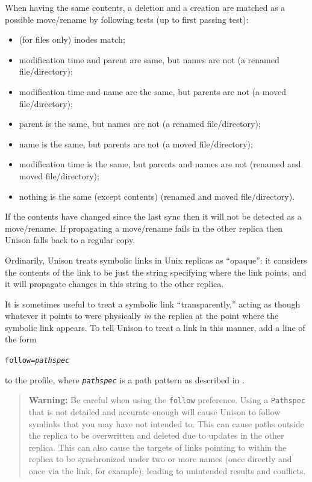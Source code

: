 \documentclass{article}
\newcommand{\ARG}[1]{\texttt{\textit{#1}}}
\begin{document}
When having the same contents, a deletion and a creation are matched as a
possible move/rename by following tests (up to first passing test):
\begin{itemize}
  \item (for files only) inodes match;
  \item modification time and parent are same, but names are not (a renamed
    file/directory);
  \item modification time and name are the same, but parents are not (a moved
    file/directory);
  \item parent is the same, but names are not (a renamed file/directory);
  \item name is the same, but parents are not (a moved file/directory);
  \item modification time is the same, but parents and names are not (renamed
    and moved file/directory);
  \item nothing is the same (except contents) (renamed and moved
    file/directory).
\end{itemize}
If the contents have changed since the last sync then it will not be detected
as a move/rename. If propagating a move/rename fails in the other replica then
Unison falls back to a regular copy.



Ordinarily, Unison treats symbolic links in Unix replicas as
``opaque'': it considers the contents of the link to be just the
string specifying where the link points, and it will propagate changes in
this string to the other replica.

It is sometimes useful to treat a symbolic link ``transparently,''
acting as though whatever it points to were physically {\em in} the
replica at the point where the symbolic link appears.  To tell Unison
to treat a link in this manner, add a line of the form
\begin{alltt}
             follow = \ARG{pathspec}
\end{alltt}
to the profile, where \ARG{pathspec} is a path pattern as described in
.

\begin{quote}
  {\bf\ifhevea\red\fi Warning:} Be careful when using the \verb|follow|
  preference. Using a \verb|Pathspec| that is not detailed and accurate enough
  will cause Unison to follow symlinks that you may have not intended to. This
  can cause paths outside the replica to be overwritten and deleted due to
  updates in the other replica.  This can also cause the targets of links
  pointing to within the replica to be synchronized under two or more names
  (once directly and once via the link, for example), leading to unintended
  results and conflicts.
\end{quote}
\end{document}
